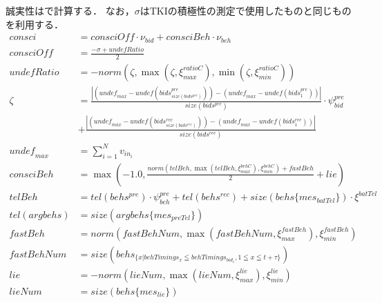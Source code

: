 誠実性はで計算する．
なお，$\sigma$はTKIの積極性の測定で使用したものと同じものを利用する．
\begin{align}
    consci &= \mathit{consciOff} \cdot \nu_{\mathit{bid}} + consciBeh \cdot \nu_{beh} \label{eq:conscientiousness} \\
    \mathit{consciOff} &= \frac{-\sigma + \mathit{undefRatio}}{2} \nonumber \\
    \mathit{undefRatio} &= -norm \left(\zeta, \max \left(\zeta, \xi_{max}^{ratioC} \right), \min \left(\zeta, \xi_{min}^{ratioC}\right) \right) \nonumber \\
    \zeta &= \frac{\left| \left(\mathit{undef_{max}} - \mathit{undef}\left(bids^{pre}_{size(bids^{pre})}\right) \right) - \left(\mathit{undef_{max}} - \mathit{undef}\left(bids^{pre}_1\right) \right) \right|}{size(bids^{pre})} \cdot \psi_{\mathit{bid}}^{pre} \nonumber \\
    &+ \frac{\left|\left(\mathit{undef_{max}} - \mathit{undef}\left(bids^{rec}_{size(bids^{rec})}\right) \right) - \left(\mathit{undef_{max}} - \mathit{undef}\left(bids^{rec}_1\right) \right) \right|}{size(bids^{rec})} \nonumber \\
    \mathit{undef_{max}} &= \sum_{i=1}^N v_{in_i} \nonumber \\
    consciBeh &= \max \left( -1.0, \frac{norm\left( \mathit{telBeh}, \max \left( \mathit{telBeh}, \xi_{max}^{\mathit{behC}}\right), \xi_{min}^{\mathit{behC}} \right) + \mathit{fastBeh}}{2} + \mathit{lie}\right) \nonumber \\
    telBeh &=  tel(behs^{pre}) \cdot \psi_{beh}^{pre} + tel(behs^{rec}) + size(behs\{mes_{\mathit{batTel}}\}) \cdot \xi^{batTel} \nonumber \\
    tel(argbehs) &= size(argbehs\{mes_{\mathit{preTel}}\}) \nonumber \\
    \mathit{fastBeh} &= norm\left( \mathit{fastBehNum}, \max \left( \mathit{fastBehNum}, \xi_{max}^{\mathit{fastBeh}}\right), \xi_{min}^{\mathit{fastBeh}} \right) \nonumber \\
    \mathit{fastBehNum} &= size \left( behs_{\{x | behTimings_x \leqq behTimings_{bid_1}, 1 \leqq x \leqq t + \tau \}} \right) \nonumber \\
    \mathit{lie} &= -norm\left( \mathit{lieNum}, \max \left( \mathit{lieNum}, \xi_{max}^{\mathit{lie}}\right), \xi_{min}^{\mathit{lie}} \right) \nonumber \\
    \mathit{lieNum} &= size(behs\{mes_{\mathit{lie}}\}) \nonumber
\end{align}

